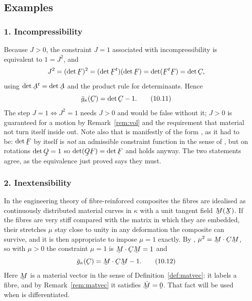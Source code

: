\subsection*{Examples}

\subsubsection*{1. Incompressibility}

Because $J>0$, the constraint $J=1$ associated with incompressibility is
equivalent to $1=J^{2}$, and
\[
   J^{2}=(\det\bF)^{2}=(\det\bF^{t})(\det\bF)=\det(\bF^{t}\bF)=\det\bC ,
\]
using $\det\bA^{t}=\det\bA$ and the product rule for determinants.
Hence
\begin{equation}
   \bar g_{\kappa}(\bC)=\det\bC-1 .
   \tag{10.11}\label{eq:10.11}
\end{equation}
The step $J=1\iff J^{2}=1$ needs $J>0$ and would be false without it;
$J>0$ is guaranteed for a motion by Remark~\ref{rem:vol} and the
requirement that material not turn itself inside out. Note also that
 is manifestly of the form , as it had to be:
$\det\bF$ by itself is \emph{not} an admissible constraint function in
the sense of , but on rotations $\det\bQ=1$ so
$\det(\bQ\bF)=\det\bF$ and  holds anyway. The two statements
agree, as the equivalence just proved says they must.

\subsubsection*{2. Inextensibility}

In the engineering theory of fibre-reinforced composites the fibres are
idealised as continuously distributed material curves in $\kappa$ with a
unit tangent field $\bM(\bX)$. If the fibres are very stiff compared with
the matrix in which they are embedded, their stretches $\mu$ stay close
to unity in any deformation the composite can survive, and it is then
appropriate to impose $\mu=1$ exactly. By , $\mu^{2}
=\ip\bM{\bC\bM}$, so with $\mu>0$ the constraint $\mu=1$ is
$\ip\bM{\bC\bM}=1$ and
\begin{equation}
   \bar g_{\kappa}(\bC)=\ip\bM{\bC\bM}-1 .
   \tag{10.12}\label{eq:10.12}
\end{equation}
Here $\bM$ is a material vector in the sense of
Definition~\ref{def:matvec}: it labels a fibre, and by
Remark~\ref{rem:matvec} it satisfies $\dot\bM=\bze$. That fact will be
used when  is differentiated.


